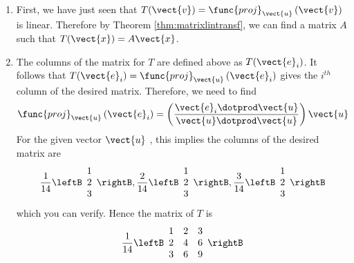 \begin{solution}
\begin{enumerate}
\item
First, we have just seen that $T (\vect{v}) = \func{proj}_{\vect{u}}\left( \vect{v}\right)$ is linear. Therefore by Theorem \ref{thm:matrixlintransf}, we can find a matrix $A$ such that $T(\vect{x}) = A\vect{x}$. 

\item
The columns of the matrix for $T$ are defined above as $T(\vect{e}_{i})$. 
It follows that $T(\vect{e}_{i}) = \func{proj}
_{\vect{u}}\left( \vect{e}_{i}\right) $ gives the $i^{th}$ column of the
desired matrix. Therefore, we need to find
\begin{equation*}
\func{proj}_{\vect{u}}\left( \vect{e}_{i}\right) = \left( \vspace{0.05in}
\frac{\vect{e}_{i}\dotprod \vect{u}}{\vect{u}\dotprod \vect{u}}\right)
\vect{u}
\end{equation*}
For the given vector $\vect{u}$ , this implies the columns of the desired
matrix are
\begin{equation*}
\vspace{0.05in}\frac{1}{14}\leftB
\begin{array}{r}
1 \\
2 \\
3
\end{array}
\rightB ,\vspace{0.05in}\frac{2}{14}\leftB
\begin{array}{r}
1 \\
2 \\
3
\end{array}
\rightB ,\vspace{0.05in}\frac{3}{14}\leftB
\begin{array}{r}
1 \\
2 \\
3
\end{array}
\rightB 
\end{equation*}
which you can verify.
Hence the matrix of $T$ is
\begin{equation*}
\vspace{0.05in}\frac{1}{14}\leftB
\begin{array}{rrr}
1 & 2 & 3 \\
2 & 4 & 6 \\
3 & 6 & 9
\end{array}
\rightB 
\end{equation*}
\end{enumerate}
\end{solution}